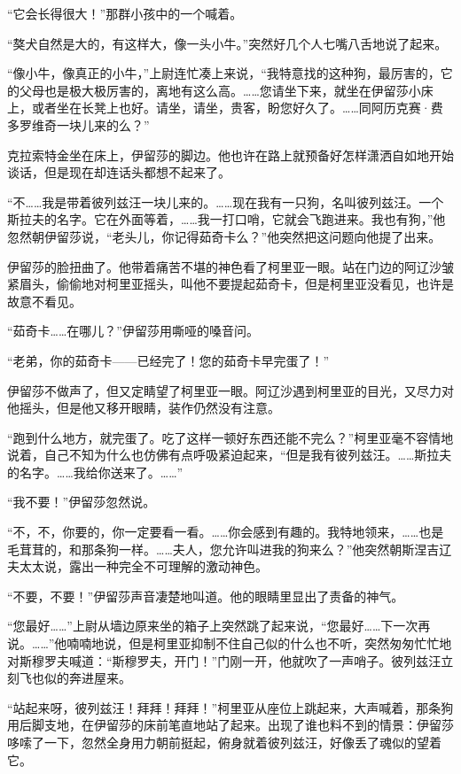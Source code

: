\par “它会长得很大！”那群小孩中的一个喊着。
\par “獒犬自然是大的，有这样大，像一头小牛。”突然好几个人七嘴八舌地说了起来。
\par “像小牛，像真正的小牛，”上尉连忙凑上来说，“我特意找的这种狗，最厉害的，它的父母也是极大极厉害的，离地有这么高。……您请坐下来，就坐在伊留莎小床上，或者坐在长凳上也好。请坐，请坐，贵客，盼您好久了。……同阿历克赛·费多罗维奇一块儿来的么？”
\par 克拉索特金坐在床上，伊留莎的脚边。他也许在路上就预备好怎样潇洒自如地开始谈话，但是现在却连话头都想不起来了。
\par “不……我是带着彼列兹汪一块儿来的。……现在我有一只狗，名叫彼列兹汪。一个斯拉夫的名字。它在外面等着，……我一打口哨，它就会飞跑进来。我也有狗，”他忽然朝伊留莎说，“老头儿，你记得茹奇卡么？”他突然把这问题向他提了出来。
\par 伊留莎的脸扭曲了。他带着痛苦不堪的神色看了柯里亚一眼。站在门边的阿辽沙皱紧眉头，偷偷地对柯里亚摇头，叫他不要提起茹奇卡，但是柯里亚没看见，也许是故意不看见。
\par “茹奇卡……在哪儿？”伊留莎用嘶哑的嗓音问。
\par “老弟，你的茹奇卡——已经完了！您的茹奇卡早完蛋了！”
\par 伊留莎不做声了，但又定睛望了柯里亚一眼。阿辽沙遇到柯里亚的目光，又尽力对他摇头，但是他又移开眼睛，装作仍然没有注意。
\par “跑到什么地方，就完蛋了。吃了这样一顿好东西还能不完么？”柯里亚毫不容情地说着，自己不知为什么也仿佛有点呼吸紧迫起来，“但是我有彼列兹汪。……斯拉夫的名字。……我给你送来了。……”
\par “我不要！”伊留莎忽然说。
\par “不，不，你要的，你一定要看一看。……你会感到有趣的。我特地领来，……也是毛茸茸的，和那条狗一样。……夫人，您允许叫进我的狗来么？”他突然朝斯涅吉辽夫太太说，露出一种完全不可理解的激动神色。
\par “不要，不要！”伊留莎声音凄楚地叫道。他的眼睛里显出了责备的神气。
\par “您最好……”上尉从墙边原来坐的箱子上突然跳了起来说，“您最好……下一次再说。……”他喃喃地说，但是柯里亚抑制不住自己似的什么也不听，突然匆匆忙忙地对斯穆罗夫喊道：“斯穆罗夫，开门！”门刚一开，他就吹了一声哨子。彼列兹汪立刻飞也似的奔进屋来。
\par “站起来呀，彼列兹汪！拜拜！拜拜！”柯里亚从座位上跳起来，大声喊着，那条狗用后脚支地，在伊留莎的床前笔直地站了起来。出现了谁也料不到的情景：伊留莎哆嗦了一下，忽然全身用力朝前挺起，俯身就着彼列兹汪，好像丢了魂似的望着它。
